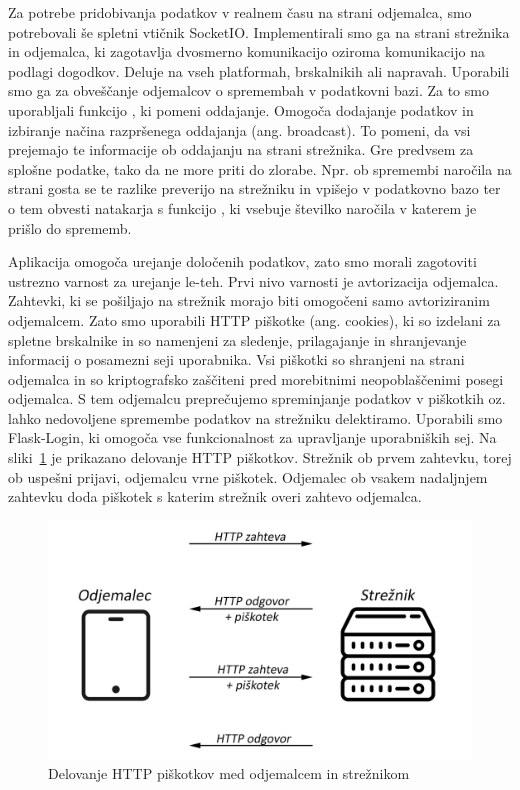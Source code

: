 \documentclass[a4paper, 12pt]{book}
\begin{document}
Za potrebe pridobivanja podatkov v realnem času na strani odjemalca, smo potrebovali še spletni vtičnik SocketIO. Implementirali smo ga na strani strežnika in odjemalca, ki zagotavlja dvosmerno komunikacijo oziroma komunikacijo na podlagi dogodkov. Deluje na vseh platformah, brskalnikih ali napravah. Uporabili smo ga za obveščanje odjemalcov o spremembah v podatkovni bazi. Za to smo uporabljali funkcijo , ki pomeni oddajanje. Omogoča dodajanje podatkov in izbiranje načina razpršenega oddajanja (ang. broadcast). To pomeni, da vsi prejemajo te informacije ob oddajanju na strani strežnika. Gre predvsem za splošne podatke, tako da ne more priti do zlorabe. Npr. ob spremembi naročila na strani gosta se te razlike preverijo na strežniku in vpišejo v podatkovno bazo ter o tem obvesti natakarja s funkcijo , ki vsebuje številko naročila v katerem je prišlo do sprememb. 
	

Aplikacija omogoča urejanje določenih podatkov, zato smo morali zagotoviti ustrezno varnost za urejanje le-teh. Prvi nivo varnosti je avtorizacija odjemalca. Zahtevki, ki se pošiljajo na strežnik morajo biti omogočeni samo avtoriziranim odjemalcem. Zato smo uporabili HTTP piškotke (ang. cookies), ki so izdelani za spletne brskalnike in so namenjeni za sledenje, prilagajanje in shranjevanje informacij o posamezni seji uporabnika. Vsi piškotki so shranjeni na strani odjemalca in so kriptografsko zaščiteni pred morebitnimi neopoblaščenimi posegi odjemalca. S tem odjemalcu preprečujemo spreminjanje podatkov v piškotkih oz. lahko nedovoljene spremembe podatkov na strežniku delektiramo. Uporabili smo Flask-Login, ki omogoča vse funkcionalnost za upravljanje uporabniških sej. 
Na sliki~\ref{Cookies} je prikazano delovanje HTTP piškotkov. Strežnik ob prvem zahtevku, torej ob uspešni prijavi, odjemalcu vrne piškotek. Odjemalec ob vsakem nadaljnjem zahtevku doda piškotek s katerim strežnik overi zahtevo odjemalca.

\begin{figure}[!htb]
\begin{center}
\includegraphics[width=14cm]{cookie-how1.png}
\caption{Delovanje HTTP piškotkov med odjemalcem in strežnikom}
\label{Cookies}
\end{center}
\end{figure}
\end{document}
